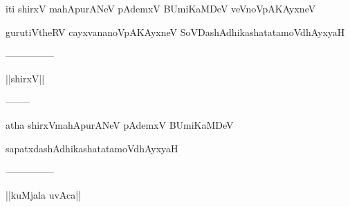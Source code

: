 \documentclass{article}
\begin{document}
\begin{center}
iti shirxV mahApurANeV pAdemxV BUmiKaMDeV veVnoVpAKAyxneV
\end{center}

\begin{center}
gurutiVtheRV cayxvananoVpAKAyxneV SoVDashAdhikashatatamoVdhAyxyaH
\end{center}

\begin{center}
---------------
\end{center}

\begin{center}
||shirxV||
\end{center}

\begin{center}
--------
\end{center}

\begin{center}
atha shirxVmahApurANeV pAdemxV BUmiKaMDeV
\end{center}

\begin{center}
sapatxdashAdhikashatatamoVdhAyxyaH
\end{center}

\begin{center}
---------------
\end{center}

\begin{center}
||kuMjala uvAca||
\end{center}
\end{document}
